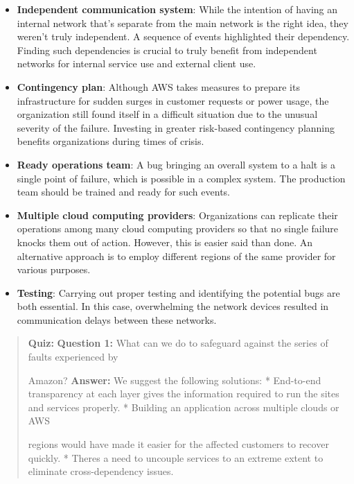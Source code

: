 \begin{itemize}
\item
\protect{}\label{HIpxTjMKNFtZD2Bc4Oe4z}
\textbf{Independent communication system}: While the intention of having an internal network that's separate from the main network is the right idea, they weren't truly independent. A sequence of events highlighted their dependency. Finding such dependencies is crucial to truly benefit from independent networks for internal service use and external client use.
\item
\protect{}\label{wnCscPiulcatu7oCDn6Ya}
\textbf{Contingency plan}: Although AWS takes measures to prepare its infrastructure for sudden surges in customer requests or power usage, the organization still found itself in a difficult situation due to the unusual severity of the failure. Investing in greater risk-based contingency planning benefits organizations during times of crisis.
\item
\protect{}\label{jAnhoBKInR-vk05Z-s4zd}
\textbf{Ready operations team}: A bug bringing an overall system to a halt is a single point of failure, which is possible in a complex system. The production team should be trained and ready for such events.
\item
\protect{}\label{X24FWWTQQr8j0hD4KmWS4}
\textbf{Multiple cloud computing providers}: Organizations can replicate their operations among many cloud computing providers so that no single failure knocks them out of action. However, this is easier said than done. An alternative approach is to employ different regions of the same provider for various purposes.
\item
\protect{}\label{xX36CT0ufpJId_LVk668S}
\textbf{Testing}: Carrying out proper testing and identifying the potential bugs are both essential. In this case, overwhelming the network devices resulted in communication delays between these networks.
\end{itemize}

\begin{quote}
\textbf{Quiz:}
\textbf{Question 1:} What can we do to safeguard against the series of faults experienced by

Amazon?
\textbf{Answer:} We suggest the following solutions: * End-to-end transparency at each layer gives the information required to run the sites and services properly. * Building an application across multiple clouds or AWS

regions would have made it easier for the affected customers to recover quickly. * There\textquotesingle s a need to uncouple services to an extreme extent to eliminate cross-dependency issues.
\end{quote}

